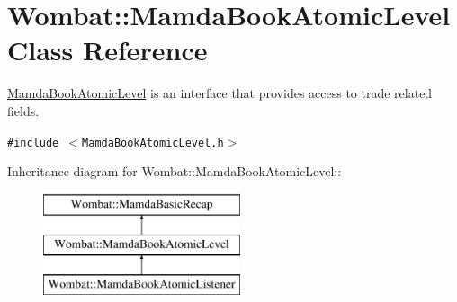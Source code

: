 \hypertarget{classWombat_1_1MamdaBookAtomicLevel}{
\section{Wombat::Mamda\-Book\-Atomic\-Level Class Reference}
\label{classWombat_1_1MamdaBookAtomicLevel}
}
\hyperlink{classWombat_1_1MamdaBookAtomicLevel}{Mamda\-Book\-Atomic\-Level} is an interface that provides access to trade related fields.  


{\tt \#include $<$Mamda\-Book\-Atomic\-Level.h$>$}

Inheritance diagram for Wombat::Mamda\-Book\-Atomic\-Level::\begin{figure}[H]
\begin{center}
\leavevmode
\includegraphics[height=3cm]{classWombat_1_1MamdaBookAtomicLevel}
\end{center}
\end{figure}
